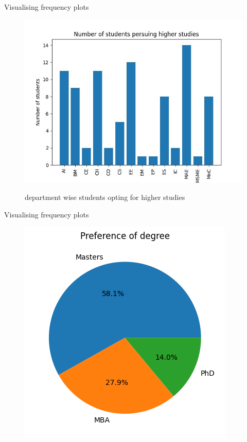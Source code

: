 \documentclass{beamer}
\begin{document}
\begin{frame}
  \begin{block}{Visualising frequency plots}
  \begin{figure}
  \centering
  \caption{department wise students opting for higher studies}
  \includegraphics[scale=0.4]{dept.jpg}
  \label{fig:5}
  \end{figure}
  \end{block}
\end{frame}

\begin{frame}
  \begin{block}{Visualising frequency plots}
  \begin{figure}
  \centering
  \includegraphics[scale=0.7]{degree.png}
  \label{fig:6}
  \end{figure}
  \end{block}
\end{frame}
\end{document}
